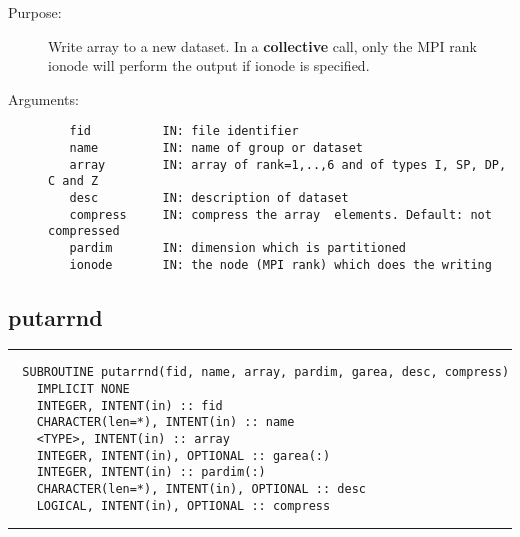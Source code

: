 \documentclass[a4paper]{article}
\begin{document}
\begin{description}
\item[Purpose:] \mbox{}

Write array to a new dataset.  In a {\bfseries collective}
call, only the MPI rank {\ttfamily ionode} will perform the output
if {\ttfamily ionode} is specified.

\item[Arguments:] \mbox{}

\begin{verbatim}
   fid          IN: file identifier
   name         IN: name of group or dataset
   array        IN: array of rank=1,..,6 and of types I, SP, DP, C and Z
   desc         IN: description of dataset
   compress     IN: compress the array  elements. Default: not compressed
   pardim       IN: dimension which is partitioned
   ionode       IN: the node (MPI rank) which does the writing

\end{verbatim}


\end{description}





\subsection{putarrnd}

\par
\addvspace{\medskipamount}
\nopagebreak\hrule
\begin{verbatim}
  SUBROUTINE putarrnd(fid, name, array, pardim, garea, desc, compress)
    IMPLICIT NONE
    INTEGER, INTENT(in) :: fid
    CHARACTER(len=*), INTENT(in) :: name
    <TYPE>, INTENT(in) :: array
    INTEGER, INTENT(in), OPTIONAL :: garea(:)
    INTEGER, INTENT(in) :: pardim(:)
    CHARACTER(len=*), INTENT(in), OPTIONAL :: desc
    LOGICAL, INTENT(in), OPTIONAL :: compress
\end{verbatim}
\nopagebreak\hrule
\addvspace{\medskipamount}
\end{document}

